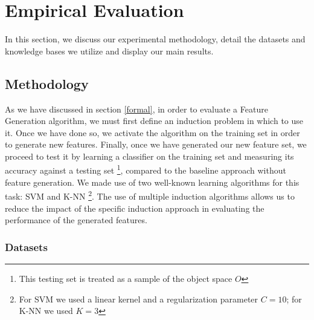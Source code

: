 \documentclass[twoside,11pt]{article}
\theoremstyle{definition}
\begin{document}
\section{Empirical Evaluation}
In this section, we discuss our experimental methodology, detail the datasets and knowledge bases we utilize and display our main results.

\subsection{Methodology}

As we have discussed in section \ref{formal}, in order to evaluate a Feature Generation algorithm, we must first define an induction problem in which to use it. Once we have done so, we activate the algorithm on the training set in order to generate new features. Finally, once we have generated our new feature set, we proceed to test it by learning a classifier on the training set and measuring its accuracy against a testing set \footnote{This testing set is treated as a sample of the object space $O$}, compared to the baseline approach without feature generation. We made use of two well-known learning algorithms for this task: SVM \cite{cortes1995support} and K-NN \cite{fix1951discriminatory}\footnote{For SVM we used a linear kernel and a regularization parameter $C=10$; for K-NN we used $K=3$}.
The use of multiple induction algorithms allows us to reduce the impact of the specific induction approach in evaluating the performance of the generated features.

\subsubsection{Datasets}
\end{document}
